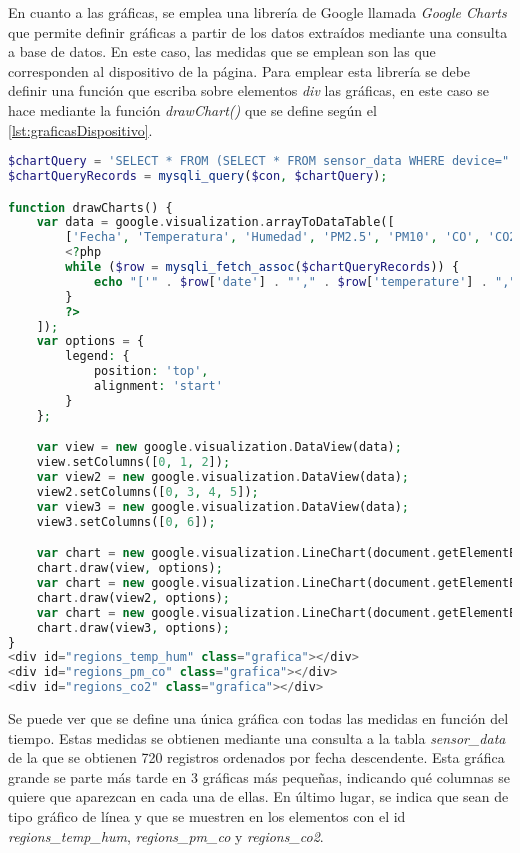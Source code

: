 En cuanto a las gráficas, se emplea una librería de Google llamada \textit{Google Charts} que permite definir gráficas a partir de los datos extraídos mediante una consulta a base de datos. En este caso, las medidas que se emplean son las que corresponden al dispositivo de la página. Para emplear esta librería se debe definir una función que escriba sobre elementos \textit{div} las gráficas, en este caso se hace mediante la función \textit{drawChart()} que se define según el \autoref{lst:graficasDispositivo}.
\begin{lstlisting}[language=PHP, caption=Gráficas de las medidas del dispositivo, label=lst:graficasDispositivo]
$chartQuery = 'SELECT * FROM (SELECT * FROM sensor_data WHERE device="' . $_GET["id"] . '" ORDER BY date DESC LIMIT 720) sub ORDER BY date ASC';
$chartQueryRecords = mysqli_query($con, $chartQuery);

function drawCharts() {
    var data = google.visualization.arrayToDataTable([
        ['Fecha', 'Temperatura', 'Humedad', 'PM2.5', 'PM10', 'CO', 'CO2'],
        <?php
        while ($row = mysqli_fetch_assoc($chartQueryRecords)) {
            echo "['" . $row['date'] . "'," . $row['temperature'] . "," . $row['humidity'] . "," . $row['pm2_5'] . "," . $row['pm10'] . "," . $row['co'] . "," . $row['co2'] . "],";
        }
        ?>
    ]);
    var options = {
        legend: {
            position: 'top',
            alignment: 'start'
        }
    };

    var view = new google.visualization.DataView(data);
    view.setColumns([0, 1, 2]);
    var view2 = new google.visualization.DataView(data);
    view2.setColumns([0, 3, 4, 5]);
    var view3 = new google.visualization.DataView(data);
    view3.setColumns([0, 6]);

    var chart = new google.visualization.LineChart(document.getElementById('regions_temp_hum'));
    chart.draw(view, options);
    var chart = new google.visualization.LineChart(document.getElementById('regions_pm_co'));
    chart.draw(view2, options);
    var chart = new google.visualization.LineChart(document.getElementById('regions_co2'));
    chart.draw(view3, options);
}
<div id="regions_temp_hum" class="grafica"></div>
<div id="regions_pm_co" class="grafica"></div>
<div id="regions_co2" class="grafica"></div>
\end{lstlisting}

Se puede ver que se define una única gráfica con todas las medidas en función del tiempo. Estas medidas se obtienen mediante una consulta a la tabla \textit{sensor\_data} de la que se obtienen 720 registros ordenados por fecha descendente. Esta gráfica grande se parte más tarde en 3 gráficas más pequeñas, indicando qué columnas se quiere que aparezcan en cada una de ellas. En último lugar, se indica que sean de tipo gráfico de línea y que se muestren en los elementos con el id \textit{regions\_temp\_hum}, \textit{regions\_pm\_co} y \textit{regions\_co2}.

